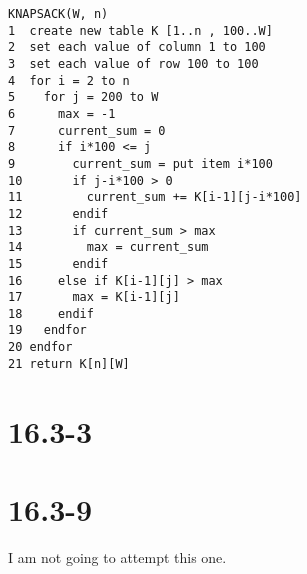 \documentclass{article}
\begin{document}
\pagebreak

\begin{verbatim}
KNAPSACK(W, n)
1  create new table K [1..n , 100..W]
2  set each value of column 1 to 100
3  set each value of row 100 to 100
4  for i = 2 to n
5    for j = 200 to W
6      max = -1
7      current_sum = 0
8      if i*100 <= j
9        current_sum = put item i*100
10       if j-i*100 > 0
11         current_sum += K[i-1][j-i*100]
12       endif
13       if current_sum > max
14         max = current_sum
15       endif
16     else if K[i-1][j] > max
17       max = K[i-1][j]
18     endif
19   endfor
20 endfor
21 return K[n][W]
\end{verbatim}

\section*{16.3-3}

\section*{16.3-9}
I am not going to attempt this one.
\end{document}
